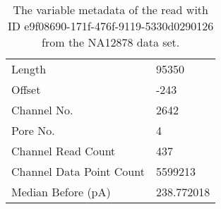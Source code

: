 \begin{table}
    \caption{\label{tab:data-read-meta}The variable metadata of the read with ID e9f08690-171f-476f-9119-5330d0290126 from the NA12878 data set.}
    \begin{tabular}{|l|l|}%
        \hline
	Length & 95350\\ %
	Offset & -243\\
	Channel No. & 2642\\ %
	Pore No. & 4\\ %
	Channel Read Count & 437\\ %
	Channel Data Point Count& 5599213\\ %
    Median Before (pA) & 238.772018\\ %
	\hline
    \end{tabular}
\end{table}
